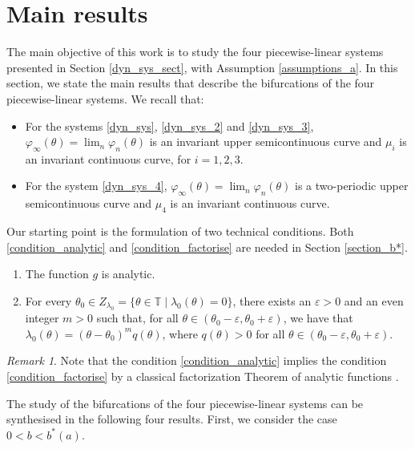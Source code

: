 \documentclass[12pt]{article}
\newcommand{\T}{\mathbb{T}}
\theoremstyle{plain}
\theoremstyle{remark}
\newtheorem{remark}[defn]{Remark}
\theoremstyle{definition}
\begin{document}
\section{Main results}\label{main_sect}
The main objective of this work is to study the four piecewise-linear systems presented in Section \ref{dyn_sys_sect}, with Assumption \ref{assumptions_a}. In this section, we state the main results that describe the bifurcations of the four piecewise-linear systems. We recall that:
\begin{itemize}
    \item For the systems \eqref{dyn_sys}, \eqref{dyn_sys_2} and \eqref{dyn_sys_3}, $\varphi_\infty(\theta)=\lim_n\varphi_n(\theta)$ is an invariant upper semicontinuous curve and $\mu_i$ is an invariant continuous curve, for $i=1,2,3$.
    \item For the system \eqref{dyn_sys_4}, $\varphi_\infty(\theta)=\lim_n\varphi_n(\theta)$ is a two-periodic upper semicontinuous curve and $\mu_4$ is an invariant continuous curve.
\end{itemize}

Our starting point is the formulation of two technical conditions. Both \ref{condition_analytic} and \ref{condition_factorise} are needed in Section \ref{section_b*}.
\begin{enumerate}[label=(\Alph*)]
    \item\label{condition_analytic} The function $g$ is analytic.

    \item\label{condition_factorise} For every $\theta_0\in Z_{\lambda_0}=\{\theta\in\T\mid\lambda_0(\theta)=0\}$, there exists an $\varepsilon>0$ and an even integer $m>0$ such that, for all $\theta\in (\theta_0-\varepsilon,\theta_0+\varepsilon)$, we have that $\lambda_0(\theta)=(\theta-\theta_0)^m q(\theta)$, where $q(\theta)>0$ for all $\theta\in (\theta_0-\varepsilon,\theta_0+\varepsilon)$.
\end{enumerate}
\begin{remark}
    Note that the condition \ref{condition_analytic} implies the condition \ref{condition_factorise} by a classical factorization Theorem of analytic functions \cite[Corollary 3.9]{Conway1978FunctComp}.
\end{remark}
The study of the bifurcations of the four piecewise-linear systems can be synthesised in the following four results. First, we consider the case $0<b<b^*(a)$.
\end{document}
